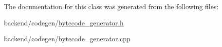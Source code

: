 The documentation for this class was generated from the following files\-:\begin{DoxyCompactItemize}
\item 
backend/codegen/\hyperlink{bytecode__generator_8h}{bytecode\-\_\-generator.\-h}\item 
backend/codegen/\hyperlink{bytecode__generator_8cpp}{bytecode\-\_\-generator.\-cpp}\end{DoxyCompactItemize}
